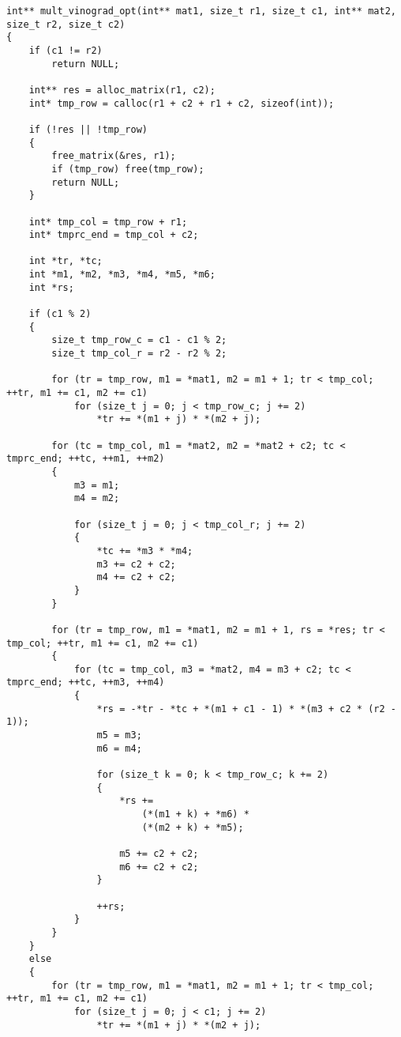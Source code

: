 \begin{center}
	\captionsetup{justification=centering, singlelinecheck=off}
	\begin{lstlisting}[label=lst:vin_opt_mult, caption=Оптимизированный алгоритм Копперсмита--Винограда умножения матриц]
int** mult_vinograd_opt(int** mat1, size_t r1, size_t c1, int** mat2, size_t r2, size_t c2)
{
    if (c1 != r2)
        return NULL;

    int** res = alloc_matrix(r1, c2);
    int* tmp_row = calloc(r1 + c2 + r1 + c2, sizeof(int));

    if (!res || !tmp_row)
    {
        free_matrix(&res, r1);
        if (tmp_row) free(tmp_row);
        return NULL;
    }

    int* tmp_col = tmp_row + r1;
    int* tmprc_end = tmp_col + c2;

    int *tr, *tc;
    int *m1, *m2, *m3, *m4, *m5, *m6;
    int *rs;

    if (c1 % 2)
    {
        size_t tmp_row_c = c1 - c1 % 2;
        size_t tmp_col_r = r2 - r2 % 2;

        for (tr = tmp_row, m1 = *mat1, m2 = m1 + 1; tr < tmp_col; ++tr, m1 += c1, m2 += c1)
            for (size_t j = 0; j < tmp_row_c; j += 2)
                *tr += *(m1 + j) * *(m2 + j);

        for (tc = tmp_col, m1 = *mat2, m2 = *mat2 + c2; tc < tmprc_end; ++tc, ++m1, ++m2)
        {
            m3 = m1;
            m4 = m2;

            for (size_t j = 0; j < tmp_col_r; j += 2)
            {
                *tc += *m3 * *m4;
                m3 += c2 + c2;
                m4 += c2 + c2;
            }
        }

        for (tr = tmp_row, m1 = *mat1, m2 = m1 + 1, rs = *res; tr < tmp_col; ++tr, m1 += c1, m2 += c1)
        {
            for (tc = tmp_col, m3 = *mat2, m4 = m3 + c2; tc < tmprc_end; ++tc, ++m3, ++m4)
            {
                *rs = -*tr - *tc + *(m1 + c1 - 1) * *(m3 + c2 * (r2 - 1));
                m5 = m3;
                m6 = m4;

                for (size_t k = 0; k < tmp_row_c; k += 2)
                {
                    *rs += 
                        (*(m1 + k) + *m6) *
                        (*(m2 + k) + *m5);

                    m5 += c2 + c2;
                    m6 += c2 + c2;
                }

                ++rs;
            }
        }
    }
    else
    {
        for (tr = tmp_row, m1 = *mat1, m2 = m1 + 1; tr < tmp_col; ++tr, m1 += c1, m2 += c1)
            for (size_t j = 0; j < c1; j += 2)
                *tr += *(m1 + j) * *(m2 + j);


\end{lstlisting}
\end{center}
